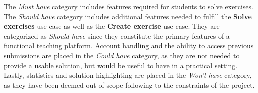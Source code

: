 The \textit{Must have} category includes features required for students to solve exercises.
The \textit{Should have} category includes additional features needed to fulfill the \textbf{Solve exercises} use case as well as the \textbf{Create exercise} use case.
They are categorized as \textit{Should have} since they constitute the primary features of a functional teaching platform.
Account handling and the ability to access previous submissions are placed in the \textit{Could have} category, as they are not needed to provide a usable solution, but would be useful to have in a practical setting.
Lastly, statistics and solution highlighting are placed in the \textit{Won't have} category, as they have been deemed out of scope following to the constraints of the project.


